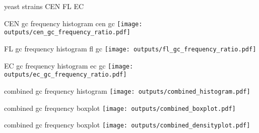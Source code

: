 \documentclass{beamer}
\begin{document}
\nocite{*}

\begin{frame} {yeast strains}
    CEN
    FL
    EC
\end{frame}

\begin{frame} {CEN gc frequency histogram}
    cen gc
    \texttt{[image: outputs/cen\_gc\_frequency\_ratio.pdf]}
\end{frame}

\begin{frame} {FL gc frequency histogram}
    fl gc
    \texttt{[image: outputs/fl\_gc\_frequency\_ratio.pdf]}
\end{frame}

\begin{frame} {EC gc frequency histogram}
    ec gc
    \texttt{[image: outputs/ec\_gc\_frequency\_ratio.pdf]}
\end{frame}

\begin{frame} {combined gc frequency histogram}
    \texttt{[image: outputs/combined\_histogram.pdf]}
\end{frame}

\begin{frame} {combined gc frequency boxplot}
    \texttt{[image: outputs/combined\_boxplot.pdf]}
\end{frame}

\begin{frame} {combined gc frequency boxplot}
    \texttt{[image: outputs/combined\_densityplot.pdf]}
\end{frame}



\end{document}
